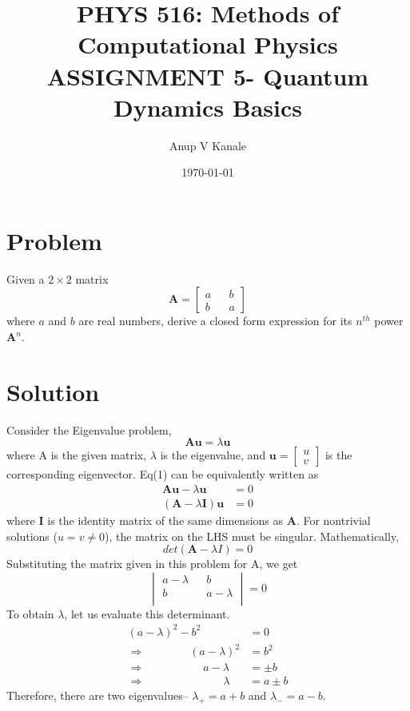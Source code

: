 \documentclass[11pt, oneside]{article}   	%
\title{\large PHYS 516: Methods of Computational Physics \\
  \normalsize ASSIGNMENT 5- Quantum Dynamics Basics}
\author{Anup V Kanale}
\date{\today}							%
\begin{document}
\maketitle
\section{Problem}
Given a $2 \times 2$ matrix
\begin{equation}
\boldsymbol{A} = 
\begin{bmatrix}
a && b \\
b && a
\end{bmatrix}
\end{equation}
where $a$ and $b$ are real numbers, derive a closed form expression for its $n^{th}$ power $\boldsymbol{A}^n$.
\section{Solution}
Consider the Eigenvalue problem,
\begin{equation}
\boldsymbol{A} \boldsymbol{u} = \lambda \boldsymbol{u}
\end{equation}
where A is the given matrix, $\lambda$ is the eigenvalue, and $\boldsymbol{u}= \begin{bmatrix}
u \\ v
\end{bmatrix}$ is the corresponding eigenvector.
Eq(1) can be equivalently written as
\begin{align}
\boldsymbol{A} \boldsymbol{u} - \lambda \boldsymbol{u} &= 0 \\
(\boldsymbol{A}-\lambda \boldsymbol{I})\boldsymbol{u} &= 0
\end{align}
where $\boldsymbol{I}$ is the identity matrix of the same dimensions as $\boldsymbol{A}$. For nontrivial solutions ($u=v \neq 0$), the matrix on the LHS must be singular. Mathematically,
\begin{equation}
det(\boldsymbol{A}-\lambda I) = 0
\end{equation}
Substituting the matrix given in this problem for A, we get
\begin{equation}
\begin{vmatrix}
a-\lambda && b \\
b && a-\lambda \\
\end{vmatrix} = 0
\end{equation}
To obtain $\lambda$, let us evaluate this determinant.
\begin{align}
(a-\lambda)^2 - b^2 &= 0 \\
\Rightarrow \qquad \qquad (a-\lambda)^2 &= b^2 \\
\Rightarrow \quad \qquad \qquad \ a-\lambda &= \pm b \\
\Rightarrow \qquad \qquad \qquad \quad \lambda &= a \pm b
\end{align}
Therefore, there are two eigenvalues-- $\lambda_+ = a + b$ and $\lambda_- = a - b$.
\end{document}
